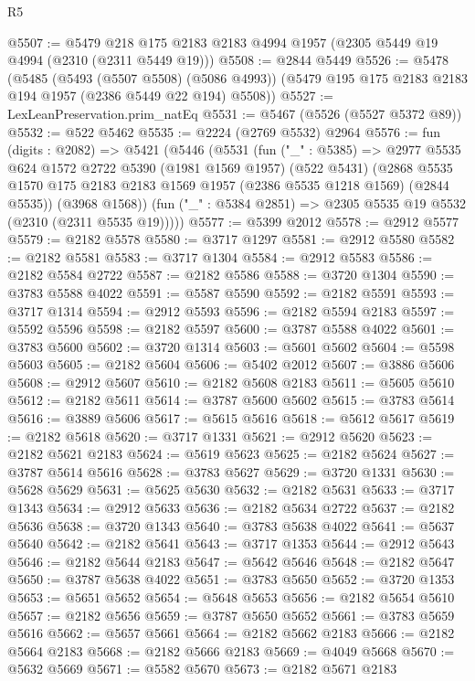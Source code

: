 \begin{lexlean}{R5}
\begin{coremodule}
@5507 := @5479 @218 @175 @2183 @2183 @4994 @1957 (@2305 @5449 @19 @4994 (@2310 (@2311 @5449 @19)))
@5508 := @2844 @5449
@5526 := @5478
    (@5485
      (@5493 (@5507 @5508) (@5086 @4993))
      (@5479 @195 @175 @2183 @2183 @194 @1957 (@2386 @5449 @22 @194) @5508))
@5527 := LexLeanPreservation.prim_natEq
@5531 := @5467 (@5526 (@5527 @5372 @89))
@5532 := @522 @5462
@5535 := @2224 (@2769 @5532) @2964
@5576 := fun (digits : @2082) =>
  @5421
    (@5446
      (@5531
        (fun ("_" : @5385) =>
        @2977
          @5535
          @624
          @1572
          @2722
          @5390
          (@1981 @1569 @1957)
          (@522 @5431)
          (@2868 @5535 @1570 @175 @2183 @2183 @1569 @1957 (@2386 @5535 @1218 @1569) (@2844 @5535))
          (@3968 @1568))
        (fun ("_" : @5384 @2851) => @2305 @5535 @19 @5532 (@2310 (@2311 @5535 @19)))))
@5577 := @5399 @2012
@5578 := @2912 @5577
@5579 := @2182 @5578
@5580 := @3717 @1297
@5581 := @2912 @5580
@5582 := @2182 @5581
@5583 := @3717 @1304
@5584 := @2912 @5583
@5586 := @2182 @5584 @2722
@5587 := @2182 @5586
@5588 := @3720 @1304
@5590 := @3783 @5588 @4022
@5591 := @5587 @5590
@5592 := @2182 @5591
@5593 := @3717 @1314
@5594 := @2912 @5593
@5596 := @2182 @5594 @2183
@5597 := @5592 @5596
@5598 := @2182 @5597
@5600 := @3787 @5588 @4022
@5601 := @3783 @5600
@5602 := @3720 @1314
@5603 := @5601 @5602
@5604 := @5598 @5603
@5605 := @2182 @5604
@5606 := @5402 @2012
@5607 := @3886 @5606
@5608 := @2912 @5607
@5610 := @2182 @5608 @2183
@5611 := @5605 @5610
@5612 := @2182 @5611
@5614 := @3787 @5600 @5602
@5615 := @3783 @5614
@5616 := @3889 @5606
@5617 := @5615 @5616
@5618 := @5612 @5617
@5619 := @2182 @5618
@5620 := @3717 @1331
@5621 := @2912 @5620
@5623 := @2182 @5621 @2183
@5624 := @5619 @5623
@5625 := @2182 @5624
@5627 := @3787 @5614 @5616
@5628 := @3783 @5627
@5629 := @3720 @1331
@5630 := @5628 @5629
@5631 := @5625 @5630
@5632 := @2182 @5631
@5633 := @3717 @1343
@5634 := @2912 @5633
@5636 := @2182 @5634 @2722
@5637 := @2182 @5636
@5638 := @3720 @1343
@5640 := @3783 @5638 @4022
@5641 := @5637 @5640
@5642 := @2182 @5641
@5643 := @3717 @1353
@5644 := @2912 @5643
@5646 := @2182 @5644 @2183
@5647 := @5642 @5646
@5648 := @2182 @5647
@5650 := @3787 @5638 @4022
@5651 := @3783 @5650
@5652 := @3720 @1353
@5653 := @5651 @5652
@5654 := @5648 @5653
@5656 := @2182 @5654 @5610
@5657 := @2182 @5656
@5659 := @3787 @5650 @5652
@5661 := @3783 @5659 @5616
@5662 := @5657 @5661
@5664 := @2182 @5662 @2183
@5666 := @2182 @5664 @2183
@5668 := @2182 @5666 @2183
@5669 := @4049 @5668
@5670 := @5632 @5669
@5671 := @5582 @5670
@5673 := @2182 @5671 @2183

\end{coremodule}
\end{lexlean}

